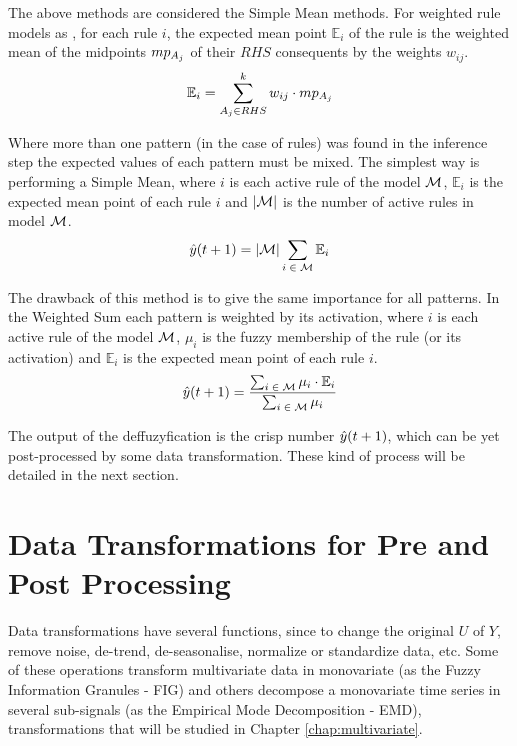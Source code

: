The above methods are considered the Simple Mean methods. For weighted rule models as \cite{sadaei2014short}, for each rule $i$, the expected mean point $\mathbb{E}_i$ of the rule is the weighted mean of the midpoints $mp_{A_j}$ of their $RHS$ consequents by the weights $w_{ij}$.
\begin{equation}
    \mathbb{E}_i = \sum_{A_j \in RHS}^k w_{ij}\cdot mp_{A_j}
\end{equation}

Where more than one pattern (in the case of rules) was found in the inference step the expected values of each pattern must be mixed. The simplest way is performing a Simple Mean, where $i$ is each active rule of the model $\mathcal{M}$, $\mathbb{E}_i$ is the expected mean point of each rule $i$ and $|\mathcal{M}|$ is the number of active rules in model $\mathcal{M}$.
\begin{equation}
    \hat{y}(t+1) = |\mathcal{M}|\sum_{i\;\in\;\mathcal{M}} \mathbb{E}_i
\end{equation}

The drawback of this method is to give the same importance for all patterns. In the Weighted Sum each pattern is weighted by its activation, where $i$ is each active rule of the model $\mathcal{M}$, $\mu_i$ is the fuzzy membership of the rule (or its activation) and $\mathbb{E}_i$ is the expected mean point of each rule $i$.
\begin{equation}
    \hat{y}(t+1) = \frac{\sum_{i\;\in\;\mathcal{M}}\mu_i\cdot \mathbb{E}_i}{\sum_{i\;\in\;\mathcal{M}}\mu_i}
\end{equation}

The output of the deffuzyfication is the crisp number $\hat{y}(t+1)$, which can be yet post-processed by some data transformation. These kind of process will be detailed in the next section.

%
\section{Data Transformations for Pre and Post Processing}
\label{sec:fts_transformations}


Data transformations have several functions, since to change the original $U$ of $Y$, remove noise, de-trend, de-seasonalise, normalize or standardize data, etc. Some of these operations transform multivariate data in monovariate (as the Fuzzy Information Granules - FIG) and others decompose a monovariate time series in several sub-signals (as the Empirical Mode Decomposition - EMD), transformations that will be studied in Chapter \ref{chap:multivariate}.

